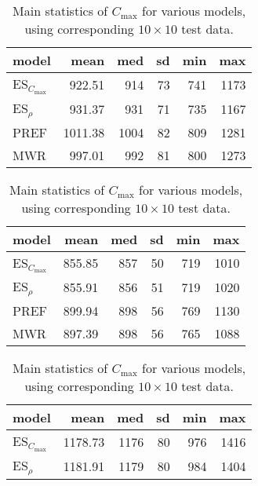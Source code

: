 \begin{table}[]\centering
    \caption{Main statistics of $C_{\max}$ for various models, using  
        corresponding $10\times 10$ test data. \newline}
    \label{tbl:results:test}
    {
        \begin{tabular}{lrrrrr}
            \toprule
            model&mean & med & sd & min & max \\ 
            \midrule
            ES$_{C_{\max}}$& 922.51 & 914 & 73 & 741 & 1173   \\ %
            ES$_\rho$& 931.37 & 931 & 71 & 735 & 1167   \\ %
            PREF&   1011.38 & 1004 & 82 & 809 & 1281 \\   %
            MWR &  997.01 & 992 & 81 & 800 & 1273   \\ %
            \bottomrule \end{tabular}}
    \quad
    {
        \begin{tabular}{lrrrrr}
            \toprule
            model& mean & med & sd & min & max \\ 
            \midrule
            ES$_{C_{\max}}$& 855.85 & 857 & 50 & 719 & 1010   \\ %
            ES$_\rho$& 855.91 & 856 & 51 & 719 & 1020   \\ %
            PREF&   899.94 & 898 & 56 & 769 & 1130  \\ %
            MWR&  897.39 & 898 & 56 & 765 & 1088   \\ %
            \bottomrule \end{tabular}}
    \quad
    {
        \begin{tabular}{lrrrrr} \toprule
            model&mean & med & sd & min & max \\   \midrule
            ES$_{C_{\max}}$& 1178.73 & 1176 & 80 & 976 & 1416   \\ %
            ES$_\rho$& 1181.91 & 1179 & 80 & 984 & 1404   \\ %

\end{tabular}}
\end{table}
